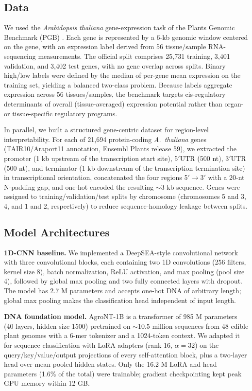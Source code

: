 \documentclass[genes,article,submit,moreauthors,pdftex]{Definitions/mdpi}
\begin{document}
\subsection{Data}
We used the \emph{Arabidopsis thaliana} gene-expression task of the Plants Genomic Benchmark (PGB) \cite{pgb2024,mendoza2024}. Each gene is represented by a 6-kb genomic window centered on the gene, with an expression label derived from 56 tissue/sample RNA-sequencing measurements. The official split comprises 25{,}731 training, 3{,}401 validation, and 3{,}402 test genes, with no gene overlap across splits. Binary high/low labels were defined by the median of per-gene mean expression on the training set, yielding a balanced two-class problem. Because labels aggregate expression across 56 tissues/samples, the benchmark targets cis-regulatory determinants of overall (tissue-averaged) expression potential rather than organ- or tissue-specific regulatory programs.

In parallel, we built a structured gene-centric dataset for region-level interpretability. For each of 21{,}694 protein-coding \emph{A.\ thaliana} genes (TAIR10/Araport11 annotation, Ensembl Plants release 59), we extracted the promoter (1 kb upstream of the transcription start site), 5$'$UTR (500 nt), 3$'$UTR (500 nt), and terminator (1 kb downstream of the transcription termination site) in transcriptional orientation, concatenated the four regions 5$'$$\rightarrow$3$'$ with a 20-nt N-padding gap, and one-hot encoded the resulting $\sim$3 kb sequence. Genes were assigned to training/validation/test splits by chromosome (chromosomes 5 and 3, 4, and 1 and 2, respectively) to reduce sequence-homology leakage between splits.

\subsection{Model Architectures}
\textbf{1D-CNN baseline.} We implemented a DeepSEA-style convolutional network \cite{zhou2015} with three convolutional blocks, each containing two 1D convolutions (256 filters, kernel size 8), batch normalization, ReLU activation, and max pooling (pool size 4), followed by global max pooling and two fully connected layers with dropout. The model has 2.7 M parameters and accepts one-hot DNA of arbitrary length; global max pooling makes the classification head independent of input length.

\textbf{DNA foundation model.} AgroNT-1B \cite{mendoza2024} is a transformer of 985 M parameters (40 layers, hidden size 1500) pretrained on $\sim$10.5 million sequences from 48 edible plant genomes with a 6-mer tokenizer and a 1024-token context. We adapted it for sequence classification with LoRA adapters (rank 16, $\alpha=32$) on the query/key/value/output projections of every self-attention block, plus a two-layer head over mean-pooled hidden states. Only the 16.2 M LoRA and head parameters (1.6\% of the total) were trainable; gradient checkpointing kept peak GPU memory within 12 GB.
\end{document}
